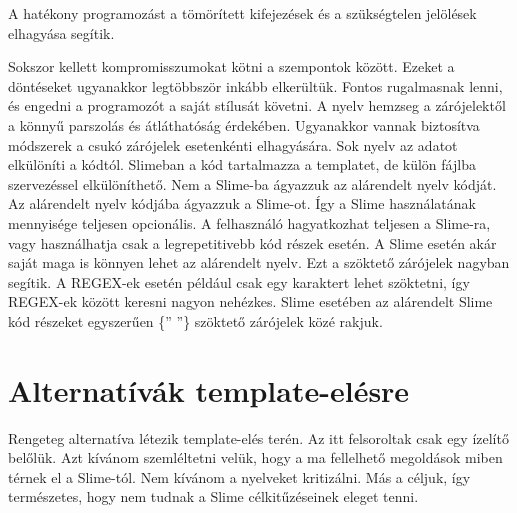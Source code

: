 A hatékony programozást a tömörített kifejezések és a szükségtelen jelölések elhagyása segítik.

Sokszor kellett kompromisszumokat kötni a szempontok között. 
Ezeket a döntéseket ugyanakkor legtöbbször inkább elkerültük. 
Fontos rugalmasnak lenni, és engedni a programozót a saját stílusát követni. 
A nyelv hemzseg a zárójelektől a könnyű parszolás és átláthatóság érdekében.
Ugyanakkor vannak biztosítva módszerek a csukó zárójelek esetenkénti elhagyására.
Sok nyelv az adatot elkülöníti a kódtól. 
Slimeban a kód tartalmazza a templatet, de külön fájlba szervezéssel elkülöníthető. 
Nem a Slime-ba ágyazzuk az alárendelt nyelv kódját. 
Az alárendelt nyelv kódjába ágyazzuk a Slime-ot. 
Így a Slime használatának mennyisége teljesen opcionális. 
A felhasználó hagyatkozhat teljesen a Slime-ra, vagy használhatja csak a legrepetitivebb kód részek esetén. 
A Slime esetén akár saját maga is könnyen lehet az alárendelt nyelv. 
Ezt a szöktető zárójelek nagyban segítik. 
A REGEX-ek esetén például csak egy karaktert lehet szöktetni, így REGEX-ek között keresni nagyon nehézkes. 
Slime esetében az alárendelt Slime kód részeket egyszerűen \{” ”\} szöktető zárójelek közé rakjuk.


\section{Alternatívák template-elésre }
Rengeteg alternatíva létezik template-elés terén.
Az itt felsoroltak csak egy ízelítő belőlük.
Azt kívánom szemléltetni velük, hogy a ma fellelhető megoldások miben térnek el a Slime-tól.
Nem kívánom a nyelveket kritizálni.
Más a céljuk, így természetes, hogy nem tudnak a Slime célkitűzéseinek eleget tenni.

